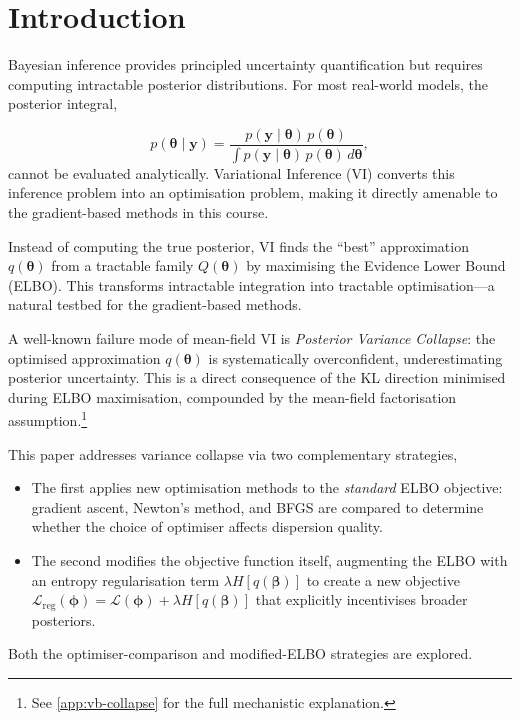 \documentclass[11pt,a4paper]{article}
\begin{document}
\newpage
\section*{Introduction}

Bayesian inference provides principled uncertainty quantification but requires computing intractable posterior distributions. For most real-world models, the posterior integral,

\begin{equation*}
    p(\bm{\theta} \mid \bm{y}) = \frac{p(\bm{y} \mid \bm{\theta})\,p(\bm{\theta})}{\displaystyle\int p(\bm{y} \mid \bm{\theta})\,p(\bm{\theta})\, d\bm{\theta}},
\end{equation*}
\noindent 
cannot be evaluated analytically. 
Variational Inference (VI) converts this inference problem into an optimisation problem, making it directly amenable to the gradient-based methods in this course. \vspace{2em}

Instead of computing the true posterior, VI finds the ``best'' approximation $q(\bm{\theta})$ from a tractable family $Q(\bm{\theta})$
by maximising the Evidence Lower Bound (ELBO). 
This transforms intractable integration into tractable optimisation---a natural testbed for the gradient-based methods. \vspace{2em} 

A well-known failure mode of mean-field VI is \emph{Posterior Variance Collapse}: 
the optimised approximation $q(\bm{\theta})$ is systematically overconfident, 
underestimating posterior uncertainty. This is a direct consequence of the KL direction minimised during ELBO maximisation, 
compounded by the mean-field factorisation assumption.\footnote{See \ref{app:vb-collapse} for the full mechanistic explanation.}  \vspace{2em} 

This paper addresses variance collapse via two complementary strategies, 
\begin{itemize}
\item The first applies new optimisation methods to the \emph{standard} ELBO objective: gradient ascent, Newton's method, and BFGS are compared to determine whether the choice of optimiser affects dispersion quality.
\item The second modifies the objective function itself, augmenting the ELBO with an entropy regularisation term $\lambda H[q(\bm{\beta})]$ to create a new objective $\mathcal{L}_{\mathrm{reg}}(\bm{\phi}) = \mathcal{L}(\bm{\phi}) + \lambda H[q(\bm{\beta})]$ that explicitly incentivises broader posteriors.
\end{itemize}
Both the optimiser-comparison and modified-ELBO strategies are explored.  \vspace{2em} 
\end{document}
